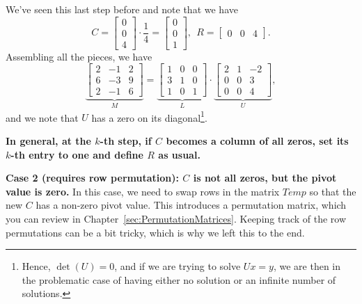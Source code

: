 We've seen this last step before and note that we have 
$$C=  \left[\begin{array}{r} 0 \\ 0 \\ 4 \end{array} \right] \cdot \frac{1}{4} =\left[\begin{array}{r} 0 \\ 0 \\ 1 \end{array} \right] ,~~R=\left[\begin{array}{rrr} 0 & 0 & 4 \end{array} \right]. $$
Assembling all the pieces, we have 
$$\underbrace{\left[ \begin{array}{rrr} 2 & -1 & 2\\
 6 & -3& 9 \\ 2 & -1 & 6  \end{array} \right]}_{M} =  \underbrace{\left[\begin{array}{rrr} 1 & 0 & 0\\ 3 & 1 & 0\\ 1 & 0  & 1\end{array} \right]}_{L} \cdot \underbrace{\left[\begin{array}{rrr} 2 & 1 & -2 \\ 0 & 0 &  3 \\ 0 &  0 & 4\end{array} \right]}_{U}, $$
 and we note that $U$ has a zero on its diagonal\footnote{Hence, $\det(U)=0$, and if we are trying to solve $Ux = y$, we are then in the problematic case of having either no solution or an infinite number of solutions.}. \\


\begin{tcolorbox}
{\bf In general, at the $k$-th step, if $C$ becomes a column of all zeros, set its $k$-th entry to one and define $R$ as usual.}
\end{tcolorbox}
\vspace*{.7cm}


\textbf{Case 2 (requires row permutation): $C$ is not all zeros, but the pivot value is zero.} In this case, we need to swap rows in the matrix $Temp$ so that the new $C$ has a non-zero  pivot value. This introduces a permutation matrix, which you can review in Chapter~\ref{sec:PermutationMatrices}. Keeping track of the row permutations can be a bit tricky, which is why we left this to the end. \\

